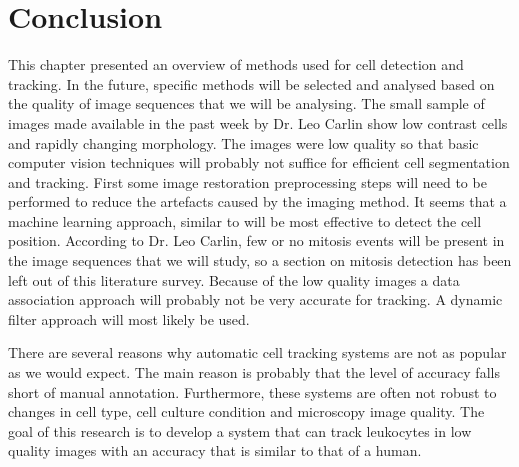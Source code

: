 
\section{Conclusion}
\label{sec:conclusionmethods}
This chapter presented an overview of methods used for cell detection and tracking. In the future, specific methods will be selected and analysed based on the quality of image sequences that we will be analysing. The small sample of images made available in the past week by Dr. Leo Carlin show low contrast cells and rapidly changing morphology. The images were low quality so that basic computer vision techniques will probably not suffice for efficient cell segmentation and tracking. First some image restoration preprocessing steps will need to be performed to reduce the artefacts caused by the imaging method. It seems that a machine learning approach, similar to \cite{arteta13} will be most effective to detect the cell position. According to Dr. Leo Carlin, few or no mitosis events will be present in the image sequences that we will study, so a section on mitosis detection has been left out of this literature survey. Because of the low quality images a data association approach will probably not be very accurate for tracking. A dynamic filter approach will most likely be used.

There are several reasons why automatic cell tracking systems are not as popular as we would expect. The main reason is probably that the level of accuracy falls short of manual annotation. Furthermore, these systems are often not robust to changes in cell type, cell culture condition and microscopy image quality. The goal of this research is to develop a system that can track leukocytes in low quality images with an accuracy that is similar to that of a human. 

